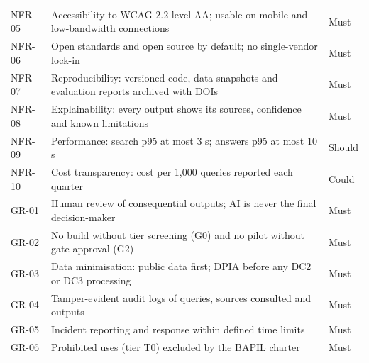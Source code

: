 \documentclass[border=10pt]{standalone}
\begin{document}
\begin{minipage}{17cm}
\begin{tabularx}{\linewidth}{@{}>{\hsize=0.422\hsize\raggedright\arraybackslash}X>{\hsize=2.156\hsize\raggedright\arraybackslash}X>{\hsize=0.422\hsize\raggedright\arraybackslash}X@{}}
NFR-05 & Accessibility to WCAG 2.2 level AA; usable on mobile and low-bandwidth connections & Must \\
NFR-06 & Open standards and open source by default; no single-vendor lock-in & Must \\
NFR-07 & Reproducibility: versioned code, data snapshots and evaluation reports archived with DOIs & Must \\
NFR-08 & Explainability: every output shows its sources, confidence and known limitations & Must \\
NFR-09 & Performance: search p95 at most 3 s; answers p95 at most 10 s & Should \\
NFR-10 & Cost transparency: cost per 1,000 queries reported each quarter & Could \\
GR-01 & Human review of consequential outputs; AI is never the final decision-maker & Must \\
GR-02 & No build without tier screening (G0) and no pilot without gate approval (G2) & Must \\
GR-03 & Data minimisation: public data first; DPIA before any DC2 or DC3 processing & Must \\
GR-04 & Tamper-evident audit logs of queries, sources consulted and outputs & Must \\
GR-05 & Incident reporting and response within defined time limits & Must \\
GR-06 & Prohibited uses (tier T0) excluded by the BAPIL charter & Must \\
\bottomrule
\end{tabularx}
\par\vspace{5pt}{\footnotesize\itshape Priority follows the MoSCoW convention (Must, Should, Could). Annex A traces 16 requirements to components, code modules and tests or pilot acceptance; the others are verified through pilot acceptance criteria, security testing or governance review.}
\par{}
\end{minipage}
\end{document}
